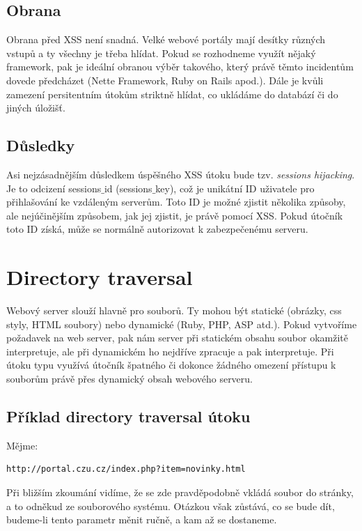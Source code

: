 \documentclass[12pt, a4paper]{report}
\begin{document}
\subsection{Obrana}
Obrana před XSS není snadná. Velké webové portály mají desítky různých vstupů a ty všechny je třeba hlídat. Pokud se rozhodneme využít nějaký framework, pak je ideální obranou výběr takového, který právě těmto incidentům dovede předcházet (Nette Framework, Ruby on Rails apod.). Dále je kvůli zamezení persitentním útokům striktně hlídat, co ukládáme do databází či do jiných úložišť.

\subsection{Důsledky}
Asi nejzásadnějším důsledkem úspěšného XSS útoku bude tzv. \textit{sessions hijacking}. Je to odcizení sessions$\_$id (sessions$\_$key), což je unikátní ID uživatele pro přihlašování ke vzdáleným serverům. Toto ID je možné zjistit několika způsoby, ale nejúčinějším způsobem, jak jej zjistit, je právě pomocí XSS. Pokud útočník toto ID získá, může se normálně autorizovat k zabezpečenému serveru.

\section{Directory traversal}
Webový server slouží hlavně pro  souborů. Ty mohou být statické (obrázky, css styly, HTML soubory) nebo dynamické (Ruby, PHP, ASP atd.). Pokud vytvoříme požadavek na web server, pak nám server při statickém obsahu soubor okamžitě interpretuje, ale při dynamickém ho nejdříve zpracuje a pak interpretuje. Při útoku typu  využívá útočník špatného či dokonce žádného omezení přístupu k souborům právě přes dynamický obsah webového serveru.

\subsection{Příklad directory traversal útoku}
Mějme:
\begin{lstlisting}[label=some-code,caption=URL adresa s podezdřením na include souboru]
http://portal.czu.cz/index.php?item=novinky.html
\end{lstlisting}
Při bližším zkoumání vidíme, že se zde pravděpodobně vkládá soubor  do stránky, a to odněkud ze souborového systému. Otázkou však zůstává, co se bude dít, budeme-li tento parametr měnit ručně, a kam až se dostaneme.
\end{document}
